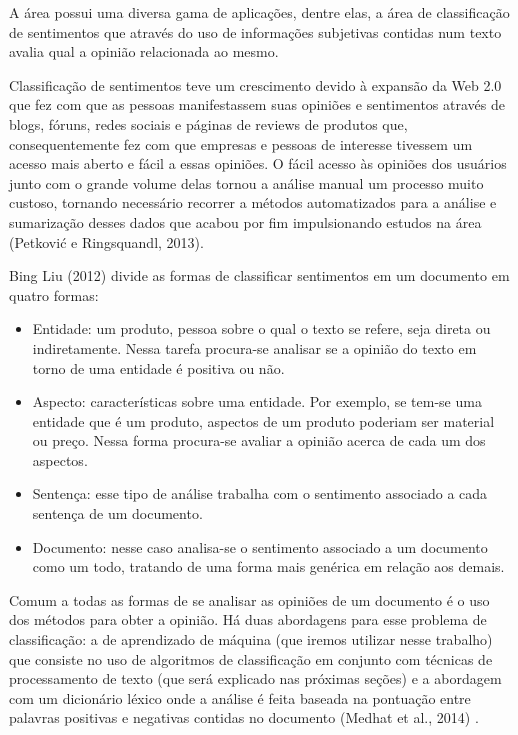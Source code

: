 A área possui uma diversa gama de aplicações, dentre elas, a área de classificação de sentimentos
que através do uso de informações subjetivas contidas num texto avalia qual a opinião relacionada
ao mesmo.

Classificação de sentimentos teve um crescimento devido à expansão da Web 2.0 que fez com que
as pessoas manifestassem suas opiniões e sentimentos através de blogs, fóruns, redes sociais
e páginas de reviews de produtos que, consequentemente fez com que empresas e pessoas de interesse
tivessem um acesso mais aberto e fácil a essas opiniões. O fácil acesso às opiniões dos usuários
junto com o grande volume delas tornou a análise manual um processo muito custoso, tornando
necessário recorrer a métodos automatizados para a análise e sumarização desses dados que
acabou por fim impulsionando estudos na área (Petković e Ringsquandl, 2013)\citep{petkovic2013}.

Bing Liu (2012)\cite{bingliu2012} divide as formas de classificar sentimentos 
em um documento em quatro formas:
\begin{itemize}
	\item Entidade:  um produto, pessoa sobre o qual o texto se refere, seja direta ou indiretamente.
	Nessa tarefa procura-se analisar se a opinião do texto em torno de uma entidade é positiva ou
	não.
	\item Aspecto: características sobre uma entidade. Por exemplo, se tem-se uma entidade que é um
	produto, aspectos de um produto poderiam ser material ou preço. Nessa forma procura-se avaliar
	a opinião acerca de cada um dos aspectos.
	\item Sentença: esse tipo de análise trabalha com o sentimento associado a cada sentença de
	um documento.
	\item Documento: nesse caso analisa-se o sentimento associado a um documento como um todo, 
	tratando de uma forma mais genérica em relação aos demais.
\end{itemize}

Comum a todas as formas de se analisar as opiniões de um documento é o uso dos métodos
para obter a opinião. Há duas abordagens para esse problema de classificação: a de aprendizado
de máquina (que iremos utilizar nesse trabalho) que consiste no uso de algoritmos de 
classificação em conjunto com técnicas de processamento de texto (que será explicado nas próximas
seções) e a abordagem com um dicionário léxico onde a análise é feita baseada na pontuação
entre palavras positivas e negativas contidas no documento (Medhat et al., 2014) \citep{medhat2014}.

